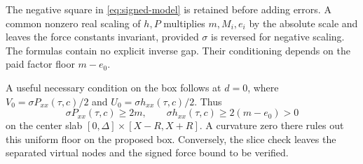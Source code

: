 The negative square in \eqref{eq:signed-model} is retained before
adding errors. A common nonzero real scaling of \(h,P\) multiplies
\(m,M_i,e_i\) by the absolute scale and leaves the force constants
invariant, provided \(\sigma\) is reversed for negative scaling.
The formulas contain no explicit inverse gap. Their conditioning
depends on the paid factor floor \(m-e_0\).

A useful necessary condition on the box follows at \(d=0\), where
\(V_0=\sigma P_{xx}(\tau,c)/2\) and \(U_0=\sigma h_{xx}(\tau,c)/2\).
Thus
\begin{equation}
\label{eq:curvature-screen}
\sigma P_{xx}(\tau,c)\ge2m,\qquad
\sigma h_{xx}(\tau,c)\ge2(m-e_0)>0
\end{equation}
on the center slab \([0,\Delta]\times[X-R,X+R]\). A curvature zero
there rules out this uniform floor on the proposed box. Conversely,
the slice check leaves the separated virtual nodes and the signed
force bound to be verified.

